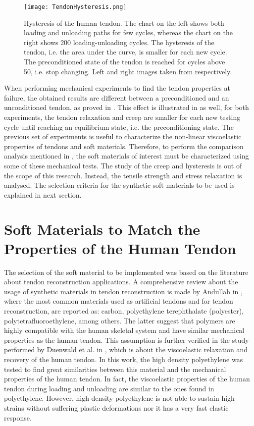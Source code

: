\begin{figure}[htb!]
    \centering
    \texttt{[image: TendonHysteresis.png]}
    \caption{Hysteresis of the human tendon. The chart on the left shows both loading and unloading paths for few cycles, whereas the chart on the right shows 200 loading-unloading cycles. The hysteresis of the tendon, i.e. the area under the curve, is smaller for each new cycle. The preconditioned state of the tendon is reached for cycles above 50, i.e. stop changing. Left and right images taken from \cite{maurel1998biomechanical,schatzmann1998effect} respectively. }
    \label{fig:tendonHysteresis}
\end{figure}

When performing mechanical experiments to find the tendon properties at failure, the obtained results are different between a preconditioned and an unconditioned tendon, as proved in \cite{schatzmann1998effect}. This effect is illustrated in  as well, for both experiments, the tendon relaxation and creep are smaller for each new testing cycle until reaching an equilibrium state, i.e. the preconditioning state. The previous set of experiments is useful to characterize the non-linear viscoelastic properties of tendons and soft materials. Therefore, to perform the comparison analysis mentioned in , the soft materials of interest must be characterized using some of these mechanical tests. The study of the creep and hysteresis is out of the scope of this research. Instead, the tensile strength and stress relaxation is analysed. The selection criteria for the synthetic soft materials to be used is explained in next section.

\section{Soft Materials to Match the Properties of the Human Tendon} \label{sec:softMaterials}

The selection of the soft material to be implemented was based on the literature about tendon reconstruction applications. A comprehensive review about the usage of synthetic materials in tendon reconstruction is made by Andullah in \cite{abdullah2015usage}, where the most common materials used as artificial tendons and for tendon reconstruction, are reported as: carbon, polyethylene terephthalate (polyester), polytetrafluoroethylene, among others. The latter suggest that polymers are highly compatible with the human skeletal system and have similar mechanical properties as the human tendon. This assumption is further verified in the study performed by Duenwald et al. in \cite{duenwald2009viscoelastic}, which is about the viscoelastic relaxation and recovery of the human tendon. In this work, the high density polyethylene was tested to find great similarities between this material and the mechanical properties of the human tendon. In fact, the viscoelastic properties of the human tendon during loading and unloading are similar to the ones found in polyethylene. However, high density polyethylene is not able to sustain high strains without suffering plastic deformations nor it has a very fast elastic response.

